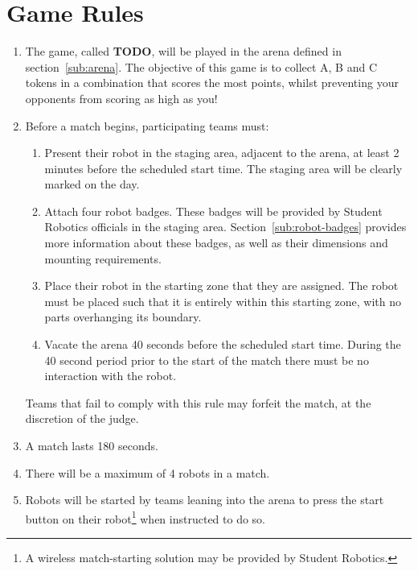 \section {Game Rules}
\label{game-rules}

\begin{enumerate}
\item The game, called \textbf{TODO}, will be played in the arena defined in section~\ref{sub:arena}.  The objective of this game is to collect A, B and C tokens in a combination that scores the most points, whilst preventing your opponents from scoring as high as you!

\item Before a match begins, participating teams must:
\begin {enumerate}
  \item Present their robot in the staging area, adjacent to the arena, at least 2 minutes before the scheduled start time.
        The staging area will be clearly marked on the day.

  \item Attach four robot badges.
        These badges will be provided by Student Robotics officials in the staging area.
        Section~\ref{sub:robot-badges} provides more information about these badges, as well as their dimensions and mounting requirements.

  \item Place their robot in the starting zone that they are assigned.
        The robot must be placed such that it is entirely within this starting zone, with no parts overhanging its boundary.

  \item Vacate the arena 40 seconds before the scheduled start time.
        During the 40 second period prior to the start of the match there must be no interaction with the robot.
\end{enumerate}
  Teams that fail to comply with this rule may forfeit the match, at the discretion of the judge.

\item A match lasts 180 seconds.

\item There will be a maximum of 4 robots in a match.

\item Robots will be started by teams leaning into the arena to press the start button on their robot\footnote{A wireless match-starting solution may be provided by Student Robotics.} when instructed to do so.


\end{enumerate}
